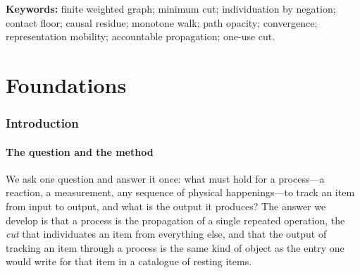 \documentclass[11pt,twocolumn,a4paper]{article}
\theoremstyle{thmstyle}
\theoremstyle{definition}
\theoremstyle{remark}
\newcommand{\flo}{\beta}                 %
\begin{document}
\begin{abstract}
output; locally arbitrary, even ``impossible,'' intermediate steps are
permitted, and rejection is only on non-convergence). The output of the
table is shown to be the same kind of object as a cell of the periodic
catalogue of resting items: the catalogue is the table evaluated at the
resting contact, and the table is the catalogue under propagation. We
close by formalising the system's emblem, the single precise cut that can
be made once and dulls the cutter: a cut is a one-use committed edge whose
residue is deposited into the cutter as much as the cut, so no instrument
cuts cleanly and stays sharp---the perfect repeatable traceless cut is
exactly the $\flo=0$ object the floor forbids. Every claim is a theorem
about finite weighted graphs; all interpretation is confined to remarks on
which no theorem depends.
\end{abstract}

\noindent\textbf{Keywords:} finite weighted graph; minimum cut;
individuation by negation; contact floor; causal residue; monotone walk;
path opacity; convergence; representation mobility; accountable
propagation; one-use cut.

\tableofcontents

\part{Foundations}

\section{Introduction}
\label{sec:intro}

\subsection{The question and the method}

We ask one question and answer it once: what must hold for a process---a
reaction, a measurement, any sequence of physical happenings---to track an
item from input to output, and what is the output it produces? The answer
we develop is that a process is the propagation of a single repeated
operation, the \emph{cut} that individuates an item from everything else,
and that the output of tracking an item through a process is the same kind
of object as the entry one would write for that item in a catalogue of
resting items.
\end{document}

